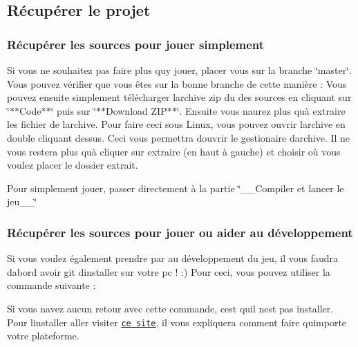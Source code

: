\subsection*{Récupérer le projet}

\subsubsection*{Récupérer les sources pour jouer simplement}

Si vous ne souhaitez pas faire plus qu\textquotesingle{}y jouer, placer vous sur la branche \char`\"{}master\char`\"{}. Vous pouvez vérifier que vous êtes sur la bonne branche de cette manière \+:  Vous pouvez ensuite simplement télécharger l\textquotesingle{}archive zip du des sources en cliquant sur \char`\"{}$\ast$$\ast$\+Code$\ast$$\ast$\char`\"{} puis sur \char`\"{}$\ast$$\ast$\+Download Z\+I\+P$\ast$$\ast$\char`\"{}. Ensuite vous n\textquotesingle{}aurez plus qu\textquotesingle{}à extraire les fichier de l\textquotesingle{}archive. Pour faire ceci sous Linux, vous pouvez ouvrir l\textquotesingle{}archive en double cliquant dessus. Ceci vous permettra d\textquotesingle{}ouvrir le gestionaire d\textquotesingle{}archive. Il ne vous restera plus qu\textquotesingle{}à cliquer sur extraire (en haut à gauche) et choisir où vous voulez placer le dossier extrait.

Pour simplement jouer, passer directement à la partie \char`\"{}\+\_\+\+\_\+\+Compiler et lancer le jeu\+\_\+\+\_\+\char`\"{}

\subsubsection*{Récupérer les sources pour jouer ou aider au développement}

Si vous voulez également prendre par au développement du jeu, il vous faudra d\textquotesingle{}abord avoir git d\textquotesingle{}installer sur votre pc ! \+:) Pour ceci, vous pouvez utiliser la commande suivante \+: 
 Si vous n\textquotesingle{}avez aucun retour avec cette commande, c\textquotesingle{}est qu\textquotesingle{}il n\textquotesingle{}est pas installer. Pour l\textquotesingle{}installer aller visiter \href{https://git-scm.com/book/en/v2/Getting-Started-Installing-Git}{\tt ce site}, il vous expliquera comment faire qu\textquotesingle{}importe votre plateforme.

